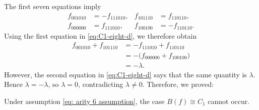 The first seven equations imply
\[
\begin{aligned}
    f_{001010}&=-f_{111010},&
    f_{101110}&=f_{110110},\\
    f_{000000}&=f_{111010},&
    f_{100100}&=-f_{110110}.
\end{aligned}
\]
Using the first equation in \eqref{eq:C1-eight-d}, we therefore obtain
\[
\begin{aligned}
    f_{001010}+f_{101110}
    &=-f_{111010}+f_{110110}\\
    &=-\bigl(f_{000000}+f_{100100}\bigr)\\
    &=-\lambda.
\end{aligned}
\]
However, the second equation in \eqref{eq:C1-eight-d} says that the same
quantity is \(\lambda\).  Hence \(\lambda=-\lambda\), so
\(\lambda=0\), contradicting \(\lambda\neq 0\).
Therefore, we proved:
\begin{lemma}\label{lm: trivial group}
    Under assumption \eqref{eq: arity 6 assumption}, the case $B(f)\cong C_1$ cannot occur.
\end{lemma}

